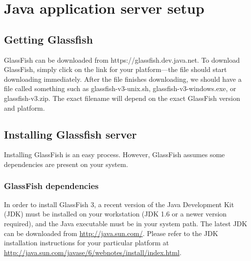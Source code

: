 \section{Java application server setup}
\subsection{Getting Glassfish}
GlassFish can be downloaded from https://glassfish.dev.java.net. To download GlassFish, simply click on the link for your platform—the file should start downloading immediately. After the file finishes downloading, we should have a file called something such as glassfish-v3-unix.sh, glassfish-v3-windows.exe, or glassfish-v3.zip. The exact filename will depend on the exact GlassFish version and platform.

\subsection{Installing Glassfish server}
Installing GlassFish is an easy process. However, GlassFish assumes some dependencies are present on your system.

\subsubsection{GlassFish dependencies}
In order to install GlassFish 3, a recent version of the Java Development Kit (JDK) must be installed on your workstation (JDK 1.6 or a newer version required), and the Java executable must be in your system path. The latest JDK can be downloaded from \url{http://java.sun.com/}. Please refer to the JDK installation instructions for your particular platform at \url{http://java.sun.com/javase/6/webnotes/install/index.html}.

